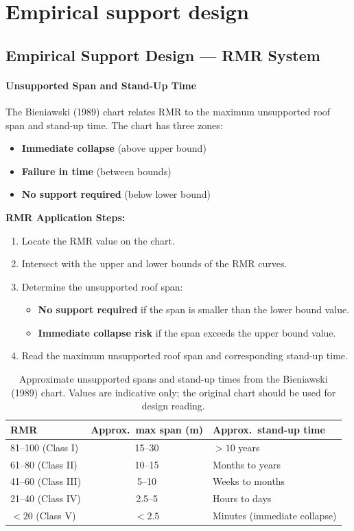 \section{Empirical support design}
\label{sec:empirical-support-design}

\subsection{Empirical Support Design --- RMR System}

\paragraph{Unsupported Span and Stand-Up Time}
The Bieniawski (1989) chart relates RMR to the maximum unsupported roof span and stand-up time. The chart has three zones:
\begin{itemize}
 \item \textbf{Immediate collapse} (above upper bound)
 \item \textbf{Failure in time} (between bounds)
 \item \textbf{No support required} (below lower bound)
\end{itemize}

\textbf{RMR Application Steps:}
\begin{enumerate}
 \item Locate the RMR value on the chart.
 \item Intersect with the upper and lower bounds of the RMR curves.
 \item Determine the unsupported roof span:
 \begin{itemize}
 \item[(a)] \textbf{No support required} if the span is smaller than the lower bound value.
 \item[(b)] \textbf{Immediate collapse risk} if the span exceeds the upper bound value.
 \end{itemize}
 \item Read the maximum unsupported roof span and corresponding stand-up time.
\end{enumerate}

\begin{table}[ht]
\centering
\begin{tabularx}{\textwidth}{l c X}
\toprule
\textbf{RMR} & \textbf{Approx.\ max span (m)} & \textbf{Approx.\ stand-up time} \\
\midrule
81--100 (Class I) & 15--30 & $>10$ years \\
61--80 (Class II) & 10--15 & Months to years \\
41--60 (Class III) & 5--10 & Weeks to months \\
21--40 (Class IV) & 2.5--5 & Hours to days \\
$<20$ (Class V) & $<2.5$ & Minutes (immediate collapse) \\
\bottomrule
\end{tabularx}
\caption{Approximate unsupported spans and stand-up times from the Bieniawski (1989) chart. Values are indicative only; the original chart should be used for design reading.}
\end{table}

